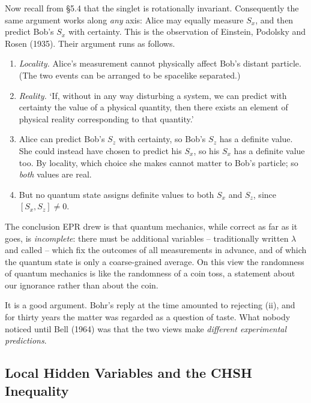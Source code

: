 Now recall from \S5.4 that the singlet is rotationally invariant. Consequently the same argument works along \emph{any} axis: Alice may equally measure $S_x$, and then predict Bob's $S_x$ with certainty. This is the observation of Einstein, Podolsky and Rosen (1935). Their argument runs as follows.

\begin{enumerate}[label=(\roman*)]
    \item \emph{Locality.} Alice's measurement cannot physically affect Bob's distant particle. (The two events can be arranged to be spacelike separated.)
    \item \emph{Reality.} `If, without in any way disturbing a system, we can predict with certainty the value of a physical quantity, then there exists an element of physical reality corresponding to that quantity.'
    \item Alice can predict Bob's $S_z$ with certainty, so Bob's $S_z$ has a definite value. She could instead have chosen to predict his $S_x$, so his $S_x$ has a definite value too. By locality, which choice she makes cannot matter to Bob's particle; so \emph{both} values are real.
    \item But no quantum state assigns definite values to both $S_x$ and $S_z$, since $[S_x, S_z]\neq0$.
\end{enumerate}

The conclusion EPR drew is that quantum mechanics, while correct as far as it goes, is \emph{incomplete}: there must be additional variables -- traditionally written $\lambda$ and called  -- which fix the outcomes of all measurements in advance, and of which the quantum state is only a coarse-grained average. On this view the randomness of quantum mechanics is like the randomness of a coin toss, a statement about our ignorance rather than about the coin.

It is a good argument. Bohr's reply at the time amounted to rejecting (ii), and for thirty years the matter was regarded as a question of taste. What nobody noticed until Bell (1964) was that the two views make \emph{different experimental predictions}.

\subsection{Local Hidden Variables and the CHSH Inequality}

